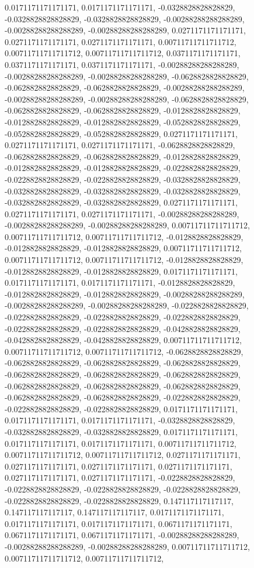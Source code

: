 \documentclass[
  ,man]{apa6}
\begin{document}
0.0171171171171171, 0.0171171171171171, -0.0328828828828829, -0.0328828828828829, -0.0328828828828829, -0.00288288288288289, -0.00288288288288289, -0.00288288288288289, 0.0271171171171171, 0.0271171171171171, 0.0271171171171171, 0.00711711711711712, 0.00711711711711712, 0.00711711711711712, 0.0371171171171171, 0.0371171171171171, 0.0371171171171171, -0.00288288288288289, -0.00288288288288289, -0.00288288288288289, -0.0628828828828829, -0.0628828828828829, -0.0628828828828829, -0.00288288288288289,
-0.00288288288288289, -0.00288288288288289, -0.0628828828828829, -0.0628828828828829, -0.0628828828828829, -0.0128828828828829, -0.0128828828828829, -0.0128828828828829, -0.0528828828828829, -0.0528828828828829, -0.0528828828828829, 0.0271171171171171, 0.0271171171171171, 0.0271171171171171, -0.0628828828828829, -0.0628828828828829, -0.0628828828828829, -0.0128828828828829, -0.0128828828828829, -0.0128828828828829, -0.0228828828828829, -0.0228828828828829, -0.0228828828828829, -0.0328828828828829,
-0.0328828828828829, -0.0328828828828829, -0.0328828828828829, -0.0328828828828829, -0.0328828828828829, 0.0271171171171171, 0.0271171171171171, 0.0271171171171171, -0.00288288288288289, -0.00288288288288289, -0.00288288288288289, 0.00711711711711712, 0.00711711711711712, 0.00711711711711712, -0.0128828828828829, -0.0128828828828829, -0.0128828828828829, 0.00711711711711712, 0.00711711711711712, 0.00711711711711712, -0.0128828828828829, -0.0128828828828829, -0.0128828828828829, 0.0171171171171171,
0.0171171171171171, 0.0171171171171171, -0.0128828828828829, -0.0128828828828829, -0.0128828828828829, -0.00288288288288289, -0.00288288288288289, -0.00288288288288289, -0.0228828828828829, -0.0228828828828829, -0.0228828828828829, -0.0228828828828829, -0.0228828828828829, -0.0228828828828829, -0.0428828828828829, -0.0428828828828829, -0.0428828828828829, 0.00711711711711712, 0.00711711711711712, 0.00711711711711712, -0.0628828828828829, -0.0628828828828829, -0.0628828828828829, -0.0628828828828829,
-0.0628828828828829, -0.0628828828828829, -0.0628828828828829, -0.0628828828828829, -0.0628828828828829, -0.0628828828828829, -0.0628828828828829, -0.0628828828828829, -0.0228828828828829, -0.0228828828828829, -0.0228828828828829, 0.0171171171171171, 0.0171171171171171, 0.0171171171171171, -0.0328828828828829, -0.0328828828828829, -0.0328828828828829, 0.0171171171171171, 0.0171171171171171, 0.0171171171171171, 0.00711711711711712, 0.00711711711711712, 0.00711711711711712, 0.0271171171171171, 0.0271171171171171,
0.0271171171171171, 0.0271171171171171, 0.0271171171171171, 0.0271171171171171, -0.0228828828828829, -0.0228828828828829, -0.0228828828828829, -0.0228828828828829, -0.0228828828828829, -0.0228828828828829, 0.147117117117117, 0.147117117117117, 0.147117117117117, 0.0171171171171171, 0.0171171171171171, 0.0171171171171171, 0.0671171171171171, 0.0671171171171171, 0.0671171171171171, -0.00288288288288289, -0.00288288288288289, -0.00288288288288289, 0.00711711711711712, 0.00711711711711712, 0.00711711711711712,
\end{document}
